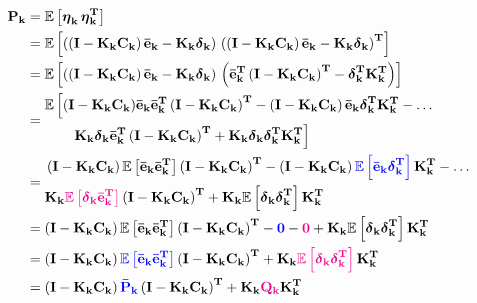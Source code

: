 \documentclass[12pt]{article}
\newcommand{\bvec}[1]{\mathbf{#1}} %
\newcommand{\bvecT}[1]{\mathbf{#1^T}} %
\newcommand{\mat}[1]{\mathbf{#1}}
\newcommand{\matT}[1]{\mathbf{#1^T}}
\newcommand{\brac}[1]{\left[#1\right]} %
\newcommand{\parentheses}[1]{\left(#1\right)}
\newcommand{\mb}[1]{{\boldsymbol{#1}}} %
\newcommand{\expv}[1]{\mathbb{E}\brac{#1}} %
\newcommand{\blue}[1]{\color{blue}#1\color{black}}
\newcommand{\magenta}[1]{\color{magenta}#1\color{black}}
\begin{document}
\begin{equation}
    \begin{aligned}
        \mat{P_k} &= \expv{\mb{\eta}_\mathbf{k}\,\mb{\eta}_\mathbf{k}^\mathbf{T}}\\
        &= \expv{\parentheses{\parentheses{\mat{I} - \mat{K_k}\mat{C_k}} \bvec{\bar{e}_k} - \mat{K_k}\mb{\delta}_\mathbf{k}}\, \parentheses{\parentheses{\mat{I} - \mat{K_k}\mat{C_k}} \bvec{\bar{e}_k} - \mat{K_k}\mb{\delta}_\mathbf{k}}^\mathbf{T}}\\
        &= \expv{\parentheses{\parentheses{\mat{I} - \mat{K_k}\mat{C_k}} \bvec{\bar{e}_k} - \mat{K_k}\mb{\delta}_\mathbf{k}}\, \parentheses{\bvecT{\bar{e}_k} \parentheses{\mat{I} - \mat{K_k}\mat{C_k}}^\mathbf{T}  - \mb{\delta}_\mathbf{k}^\mathbf{T}\matT{K_k}}}\\
        &= \begin{aligned}
        \mathbb{E}\,\Big[(\mat{I}& - \mat{K_k}\mat{C_k}) \bvec{\bar{e}_k} \bvecT{\bar{e}_k} \parentheses{\mat{I} - \mat{K_k}\mat{C_k}}^\mathbf{T} - \parentheses{\mat{I} - \mat{K_k}\mat{C_k}} \bvec{\bar{e}_k}\mb{\delta}_\mathbf{k}^\mathbf{T}\matT{K_k} - \dots \\ &\mat{K_k}\mb{\delta}_\mathbf{k}\bvecT{\bar{e}_k} \parentheses{\mat{I} - \mat{K_k}\mat{C_k}}^\mathbf{T} + \mat{K_k}\mb{\delta}_\mathbf{k}\mb{\delta}_\mathbf{k}^\mathbf{T}\matT{K_k}\Big]
        \end{aligned}\\
        &= \begin{aligned}
        &\parentheses{\mat{I} - \mat{K_k}\mat{C_k}} \expv{\bvec{\bar{e}_k} \bvecT{\bar{e}_k}} \parentheses{\mat{I} - \mat{K_k}\mat{C_k}}^\mathbf{T} - \parentheses{\mat{I} - \mat{K_k}\mat{C_k}} \blue{\expv{\bvec{\bar{e}_k}\mb{\delta}_\mathbf{k}^\mathbf{T}}}\matT{K_k} - \dots \\ &\mat{K_k} \magenta{\expv{\mb{\delta}_\mathbf{k}\bvecT{\bar{e}_k}}} \parentheses{\mat{I} - \mat{K_k}\mat{C_k}}^\mathbf{T} + \mat{K_k}\expv{\mb{\delta}_\mathbf{k}\mb{\delta}_\mathbf{k}^\mathbf{T}}\matT{K_k}
        \end{aligned}\\
        &=\parentheses{\mat{I} - \mat{K_k}\mat{C_k}} \expv{\bvec{\bar{e}_k} \bvecT{\bar{e}_k}} \parentheses{\mat{I} - \mat{K_k}\mat{C_k}}^\mathbf{T} - \blue{\mat{0}} - \magenta{\mat{0}} + \mat{K_k}\expv{\mb{\delta}_\mathbf{k}\mb{\delta}_\mathbf{k}^\mathbf{T}}\matT{K_k}\\
        &=\parentheses{\mat{I} - \mat{K_k}\mat{C_k}} \blue{\expv{\bvec{\bar{e}_k} \bvecT{\bar{e}_k}}} \parentheses{\mat{I} - \mat{K_k}\mat{C_k}}^\mathbf{T} + \mat{K_k}\magenta{\expv{\mb{\delta}_\mathbf{k}\mb{\delta}_\mathbf{k}^\mathbf{T}}}\matT{K_k}\\
        &=\parentheses{\mat{I} - \mat{K_k}\mat{C_k}} \blue{\mat{\bar{P}_k}} \parentheses{\mat{I} - \mat{K_k}\mat{C_k}}^\mathbf{T} + \mat{K_k}\magenta{\mat{Q_k}}\matT{K_k}
    \end{aligned}
    \label{eq:kf-estimate-covariance}
\end{equation}
\end{document}
